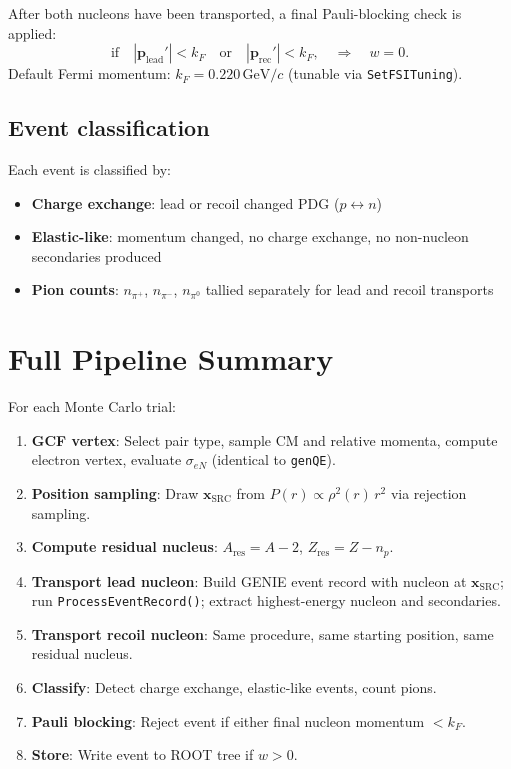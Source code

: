 \documentclass[11pt,a4paper]{article}
\newcommand{\vect}[1]{\bm{#1}}
\newcommand{\unit}[1]{\,\mathrm{#1}}
\newcommand{\GeV}{\unit{GeV}}
\begin{document}
After both nucleons have been transported, a final Pauli-blocking check
is applied:
\begin{equation}
  \text{if}\quad |\vect{p}_{\text{lead}}'| < k_{F}
  \quad\text{or}\quad |\vect{p}_{\text{rec}}'| < k_{F},
  \quad\Longrightarrow\quad w = 0.
\end{equation}
Default Fermi momentum: $k_{F} = 0.220\GeV/c$ (tunable via
\texttt{SetFSITuning}).

\subsection{Event classification}

Each event is classified by:
\begin{itemize}[nosep]
  \item \textbf{Charge exchange}: lead or recoil changed PDG
        ($p \leftrightarrow n$)
  \item \textbf{Elastic-like}: momentum changed, no charge exchange,
        no non-nucleon secondaries produced
  \item \textbf{Pion counts}: $n_{\pi^{+}}$, $n_{\pi^{-}}$, $n_{\pi^{0}}$
        tallied separately for lead and recoil transports
\end{itemize}

\section{Full Pipeline Summary}

For each Monte Carlo trial:
\begin{enumerate}
  \item \textbf{GCF vertex}: Select pair type, sample CM and relative
        momenta, compute electron vertex, evaluate $\sigma_{eN}$
        (identical to \texttt{genQE}).
  \item \textbf{Position sampling}: Draw $\vect{x}_{\text{SRC}}$ from
        $P(r) \propto \rho^{2}(r)\,r^{2}$ via rejection sampling.
  \item \textbf{Compute residual nucleus}: $A_{\text{res}} = A - 2$,
        $Z_{\text{res}} = Z - n_{p}$.
  \item \textbf{Transport lead nucleon}: Build GENIE event record with
        nucleon at $\vect{x}_{\text{SRC}}$; run
        \texttt{ProcessEventRecord()}; extract highest-energy nucleon and
        secondaries.
  \item \textbf{Transport recoil nucleon}: Same procedure, same starting
        position, same residual nucleus.
  \item \textbf{Classify}: Detect charge exchange, elastic-like events,
        count pions.
  \item \textbf{Pauli blocking}: Reject event if either final nucleon
        momentum $< k_{F}$.
  \item \textbf{Store}: Write event to ROOT tree if $w > 0$.
\end{enumerate}
\end{document}
